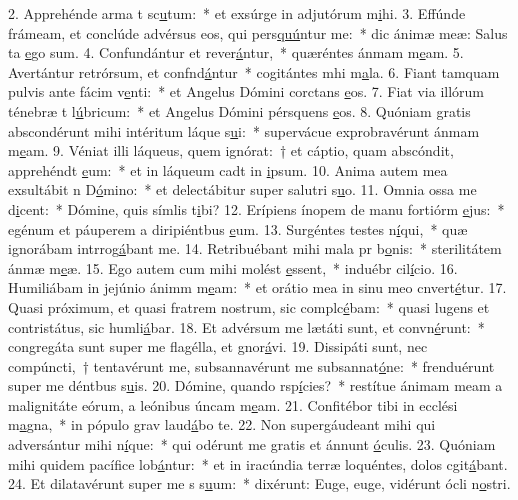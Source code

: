 2. Apprehénde arma t sc\uline{u}tum:~* et exsúrge in adjutórum m\uline{i}hi.
3. Effúnde frámeam, et conclúde advérsus eos, qui pers\uline{quú}ntur me:~* dic ánimæ meæ: Salus ta \uline{e}go sum.
4. Confundántur et rever\uline{á}ntur,~* quæréntes ánmam m\uline{e}am.
5. Avertántur retrórsum, et confnd\uline{á}ntur~* cogitántes mhi m\uline{a}la.
6. Fiant tamquam pulvis ante fácim v\uline{e}nti:~* et Angelus Dómini corctans \uline{e}os.
7. Fiat via illórum ténebræ t l\uline{ú}bricum:~* et Angelus Dómini pérsquens \uline{e}os.
8. Quóniam gratis abscondérunt mihi intéritum láque s\uline{u}i:~* supervácue exprobravérunt ánmam m\uline{e}am.
9. Véniat illi láqueus, quem ignórat:~† et cáptio, quam abscóndit, apprehéndt \uline{e}um:~* et in láqueum cadt in \uline{i}psum.
10. Anima autem mea exsultábit n D\uline{ó}mino:~* et delectábitur super salutri s\uline{u}o.
11. Omnia ossa me d\uline{i}cent:~* Dómine, quis símlis t\uline{i}bi?
12. Erípiens ínopem de manu fortiórm \uline{e}jus:~* egénum et páuperem a diripiéntbus \uline{e}um.
13. Surgéntes testes n\uline{í}qui,~* quæ ignorábam intrrog\uline{á}bant me.
14. Retribuébant mihi mala pr b\uline{o}nis:~* sterilitátem ánmæ m\uline{e}æ.
15. Ego autem cum mihi molést \uline{e}ssent,~* induébr cil\uline{í}cio.
16. Humiliábam in jejúnio ánimm m\uline{e}am:~* et orátio mea in sinu meo cnvert\uline{é}tur.
17. Quasi próximum, et quasi fratrem nostrum, sic complc\uline{é}bam:~* quasi lugens et contristátus, sic humli\uline{á}bar.
18. Et advérsum me lætáti sunt, et convn\uline{é}runt:~* congregáta sunt super me flagélla, et gnor\uline{á}vi.
19. Dissipáti sunt, nec compúncti,~† tentavérunt me, subsannavérunt me subsannat\uline{ó}ne:~* frenduérunt super me déntbus s\uline{u}is.
20. Dómine, quando rsp\uline{í}cies?~* restítue ánimam meam a malignitáte eórum, a leónibus úncam m\uline{e}am.
21. Confitébor tibi in ecclési m\uline{a}gna,~* in pópulo grav laud\uline{á}bo te.
22. Non supergáudeant mihi qui adversántur mihi n\uline{í}que:~* qui odérunt me gratis et ánnunt \uline{ó}culis.
23. Quóniam mihi quidem pacífice lob\uline{á}ntur:~* et in iracúndia terræ loquéntes, dolos cgit\uline{á}bant.
24. Et dilatavérunt super me s s\uline{u}um:~* dixérunt: Euge, euge, vidérunt ócli n\uline{o}stri.
